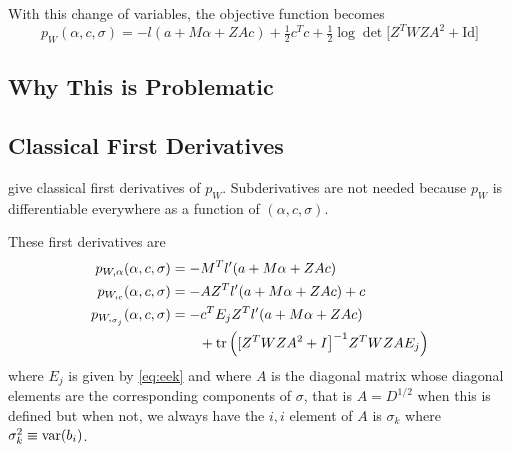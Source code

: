 With this change of variables, the objective function becomes
\begin{equation} \label{eq:pee-sigma}
   p_W(\alpha, c, \sigma) =
   - l(a + M \alpha + Z A c) + \tfrac{1}{2} c^T c
   + \tfrac{1}{2} \log \det \bigl[ Z^T W Z A^2 + \text{Id}
   \bigr]
\end{equation}

\subsection{Why This is Problematic}
\label{sec:problematic}

\subsection{Classical First Derivatives}
\label{sec:first-derivatives-sigma}

\citet[Section~1.11.1]{reaster-tr} give classical first derivatives of $p_W$.
Subderivatives are not needed because $p_W$ is differentiable everywhere
as a function of $(\alpha, c, \sigma)$.

These first derivatives are
\begin{subequations}
\begin{align}
   p_{W, \alpha}(\alpha, c, \sigma)
   & =
   - M^T l'(a + M \alpha + Z A c)
   \label{eq:key-rooted-alpha}
   \\
   p_{W,_c}(\alpha, c, \sigma)
   & =
   - A Z^T l'(a + M \alpha + Z A c)
   + c
   \label{eq:key-rooted-c}
   \\
   p_{W,_{\sigma_j}}(\alpha, c, \sigma)
   & =
   - c^T E_j Z^T l'(a + M \alpha + Z A c)
   \nonumber
   \\
   & \qquad
   +
   \operatorname{tr}\left( [ Z^T W Z A^2 + I \bigr]^{- 1}
   Z^T W Z A E_j
   \right)
   \label{eq:key-rooted-sigma}
\end{align}
\end{subequations}
where $E_j$ is given by \eqref{eq:eek} and where $A$ is the diagonal matrix
whose diagonal elements are the corresponding components of $\sigma$, that
is $A = D^{1 / 2}$ when this is defined but when not, we always have the $i, i$
element of $A$ is $\sigma_k$ where $\sigma^2_k \equiv \operatorname{var}(b_i)$.

